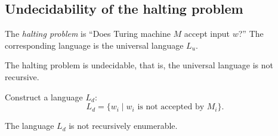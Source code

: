 \begin{page}
\setcounter{section}{8}
\setcounter{subsection}{5}
\setcounter{dfn}{7}
\label{portion:1203}

\subsection{Undecidability of the halting problem}
The \emph{halting problem} is ``Does Turing machine $M$ accept input $w$?''
The corresponding language is the universal language $L_u$.


\end{page}

\begin{page}
\setcounter{section}{8}
\setcounter{subsection}{5}
\setcounter{dfn}{8}
\label{portion:1205}

\begin{thm}
\label{thm:HaltingProblem}
The halting problem is undecidable, that is, the universal language is not recursive.
\end{thm}

\end{page}

\begin{page}
\setcounter{section}{8}
\setcounter{subsection}{5}
\setcounter{dfn}{8}
\label{portion:1206}


Construct a language $L_d$:
\[
L_d = \{w_i \mid w_i \text{ is not accepted by }M_i\}.
\]


\end{page}

\begin{page}
\setcounter{section}{8}
\setcounter{subsection}{5}
\setcounter{dfn}{9}
\label{portion:1208}

\begin{lem}
\label{lem:LdNotRE}
The language $L_d$ is not recursively enumerable.
\end{lem}

\end{page}

